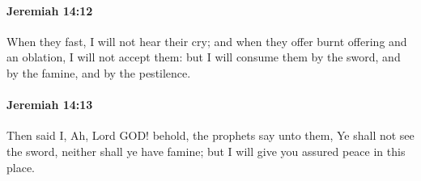 		\paragraph{Jeremiah 14:12} %
			\label{JEREMIAH-14-12}

			When they fast, I will not hear their cry; and when they offer burnt offering and an oblation, I will not accept them: but I will consume them by the sword, and by the famine, and by the pestilence.


		\paragraph{Jeremiah 14:13} %
			\label{JEREMIAH-14-13}

			Then said I, Ah, Lord GOD! behold, the prophets say unto them, Ye shall not see the sword, neither shall ye have famine; but I will give you assured peace in this place.

